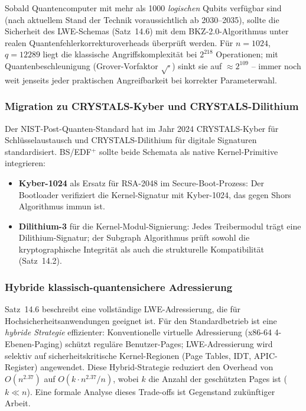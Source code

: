 ﻿\documentclass[a4paper,12pt]{scrreprt}
\theoremstyle{definition}
\begin{document}
	Sobald Quantencomputer mit mehr als 1000 \emph{logischen} Qubits verfügbar
	sind (nach aktuellem Stand der Technik voraussichtlich ab 2030--2035),
	sollte die Sicherheit des LWE-Schemas (Satz~14.6) mit dem BKZ-2.0-Algorithmus
	\cite{Chen2011} unter realen Quantenfehlerkorrekturoverheads überprüft werden.
	Für $n = 1024$, $q = 12289$ liegt die klassische Angriffskomplexität bei
	$2^{218}$ Operationen; mit Quantenbeschleunigung (Grover-Vorfaktor
	$\sqrt{\cdot}$) sinkt sie auf $\approx 2^{109}$ -- immer noch weit jenseits
	jeder praktischen Angreifbarkeit bei korrekter Parameterwahl.
	
	\subsubsection{Migration zu CRYSTALS-Kyber und CRYSTALS-Dilithium}
	
	Der NIST-Post-Quanten-Standard hat im Jahr 2024 CRYSTALS-Kyber \cite{Bos2018}
	für Schlüsselaustausch und CRYSTALS-Dilithium \cite{Ducas2018} für
	digitale Signaturen standardisiert. BS/EDF$^+$ sollte beide Schemata
	als native Kernel-Primitive integrieren:
	
	\begin{itemize}
		\item \textbf{Kyber-1024} als Ersatz für RSA-2048 im Secure-Boot-Prozess:
		Der Bootloader verifiziert die Kernel-Signatur mit Kyber-1024,
		das gegen Shors Algorithmus \cite{Shor1994} immun ist.
		\item \textbf{Dilithium-3} für die Kernel-Modul-Signierung:
		Jedes Treibermodul trägt eine Dili\-thium-Signatur; der Subgraph
		Algorithmus prüft sowohl die kryptographische Integrität als auch
		die strukturelle Kompatibilität (Satz~14.2).
	\end{itemize}
	
	\subsubsection{Hybride klassisch-quantensichere Adressierung}
	
	Satz~14.6 beschreibt eine vollständige LWE-Adressierung, die für
	Hochsicherheitsanwendungen geeignet ist. Für den Standardbetrieb
	ist eine \emph{hybride Strategie} effizienter: Konventionelle
	virtuelle Adressierung (x86-64 4-Ebenen-Paging) schützt reguläre
	Benutzer-Pages; LWE-Adressierung wird selektiv auf
	sicherheitskritische Kernel-Regionen (Page Tables, IDT, APIC-Register)
	angewendet. Diese Hybrid-Strategie reduziert den Overhead von
	$O(n^{2.37})$ auf $O(k \cdot n^{2.37}/n)$, wobei $k$ die Anzahl
	der geschützten Pages ist ($k \ll n$). Eine formale
	Analyse dieses Trade-offs ist Gegenstand zukünftiger Arbeit.
	
\end{document}
